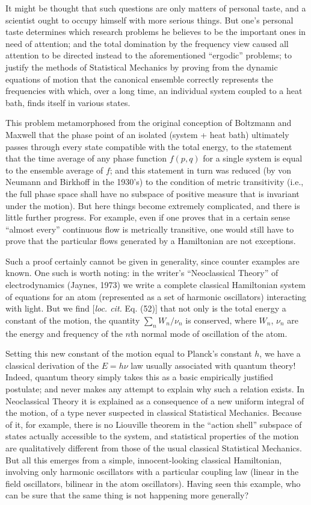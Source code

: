 It might be thought that such questions are only matters of personal taste, and a scientist ought to occupy himself with more serious things.
But one's personal taste determines which research problems he believes to be the important ones in need of attention; and the total domination by the frequency view caused all attention to be directed instead to the aforementioned ``ergodic'' problems; to justify the methods of Statistical Mechanics by proving from the dynamic equations of motion that the canonical ensemble correctly represents the frequencies with which, over a long time, an individual system coupled to a heat bath, finds itself in various states.

This problem metamorphosed from the original conception of Boltzmann and Maxwell that the phase point of an isolated (system + heat bath) ultimately passes through every state compatible with the total energy, to the statement that the time average of any phase function $f(p,q)$ for a single system is equal to the ensemble average of $f$; and this statement in turn was reduced (by von Neumann and Birkhoff in the 1930's) to the condition of metric transitivity (i.e., the full phase space shall have no subspace of positive measure that is invariant under the motion).
But here things become extremely complicated, and there is little further progress.
For example, even if one proves that in a certain sense ``almost every'' continuous flow is metrically transitive, one would still have to prove that the particular flows generated by a Hamiltonian are not exceptions.

Such a proof certainly cannot be given in generality, since counter examples are known.
One such is worth noting: in the writer's ``Neoclassical Theory'' of electrodynamics (Jaynes, \cite{jaynes73}{1973}) we write a complete classical Hamiltonian system of equations for an atom (represented as a set of harmonic oscillators) interacting with light.
But we find [\emph{loc. cit.} Eq. (52)] that not only is the total energy a constant of the motion, the quantity $\sum_n W_n/\nu_n$ is conserved, where $W_n$, $\nu_n$ are the energy and frequency of the $n$th normal mode of oscillation of the atom.

Setting this new constant of the motion equal to Planck's constant $h$, we have a classical derivation of the $E=h\nu$ law usually associated with quantum theory!
Indeed, quantum theory simply takes this as a basic empirically justified postulate; and never makes any attempt to explain why such a relation exists.
In Neoclassical Theory it is explained as a consequence of a new uniform integral of the motion, of a type never suspected in classical Statistical Mechanics.
Because of it, for example, there is no Liouville theorem in the ``action shell'' subspace of states actually accessible to the system, and statistical properties of the motion are qualitatively different from those of the usual classical Statistical Mechanics.
But all this emerges from a simple, innocent-looking classical Hamiltonian, involving only harmonic oscillators with a particular coupling law (linear in the field oscillators, bilinear in the atom oscillators). Having seen this example, who can be sure that the same thing is not happening more generally?

